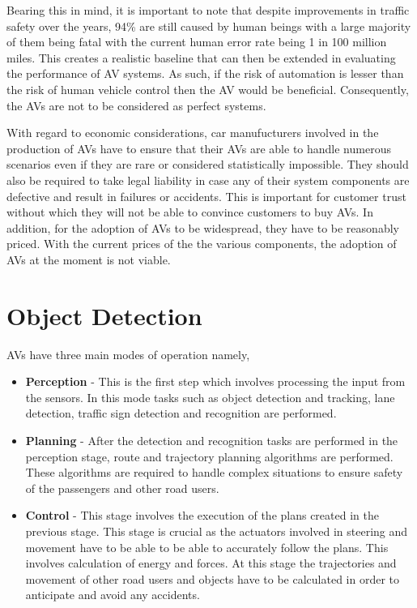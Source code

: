 Bearing this in mind, it is important to note that despite improvements in traffic safety over the years, 94\% are still caused by human beings with a large majority of them being fatal with the current human error rate being 1 in 100 million miles. This creates a realistic baseline that can then be extended in evaluating the performance of AV systems. As such, if the risk of automation is lesser than the risk of human vehicle control then the AV would be beneficial. Consequently, the AVs are not to be considered as perfect systems.

With regard to economic considerations, car manufucturers involved in the production of AVs have to ensure that their AVs are able to handle numerous scenarios even if they are rare or considered statistically impossible. They should also be required to take legal liability in case any of their system components are defective and result in failures or accidents. This is important for customer trust without which they will not be able to convince customers to buy AVs. In addition, for the adoption of AVs to be widespread, they have to be reasonably priced. With the current prices of the the various components, the adoption of AVs at the moment is not viable. 


\section{Object Detection}

AVs have three main modes of operation namely,
\begin{itemize}
	\item \textbf{Perception} - This is the first step which involves processing the input from the sensors. In this mode tasks such as object detection and tracking, lane detection, traffic sign detection and recognition are performed.
	\item \textbf{Planning} - After the detection and recognition tasks are performed in the perception stage, route and trajectory planning algorithms are performed. These algorithms are required to handle complex situations to ensure safety of the passengers and other road users. 
	\item \textbf{Control} - This stage involves the execution of the plans created in the previous stage. This stage is crucial as the actuators involved in steering and movement have to be able to be able to accurately follow the plans. This involves calculation of energy and forces. At this stage the trajectories and movement of other road users and objects have to be calculated in order to anticipate and avoid any accidents. 
	
\end{itemize}

